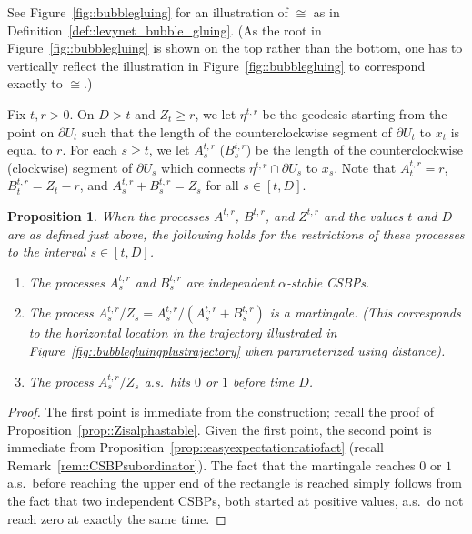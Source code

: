\documentclass[JEP,XML,SOM,Unicode]{cedram}
\theoremstyle{plain}
\numberwithin{theorem}{section}
\newtheorem{proposition}[theorem]{Proposition}
\theoremstyle{definition}
\begin{document}
See Figure~\ref{fig::bubblegluing} for an illustration of $\cong$ as in Definition~\ref{def::levynet_bubble_gluing}. (As the root in Figure~\ref{fig::bubblegluing} is shown on the top rather than the bottom, one has to vertically reflect the illustration in Figure~\ref{fig::bubblegluing} to correspond exactly to $\cong$.)

Fix $t, r > 0$. On $D > t$ and $Z_t \geq r$, we let $\eta^{t,r}$ be the geodesic starting from the point on $\partial U_t$ such that the length of the counterclockwise segment of $\partial U_t$ to $x_t$ is equal to $r$. For each $s \geq t$, we let $A_s^{t,r}$ (\resp $B_s^{t,r}$) be the length of the counterclockwise (\resp clockwise) segment of $\partial U_s$ which connects $\eta^{t,r} \cap \partial U_s$ to $x_s$. Note that $A_t^{t,r} = r$, $B_t^{t,r} = Z_t - r$, and $A_s^{t,r} + B_s^{t,r} = Z_s$ for all $s \in [t,D]$.

\begin{proposition}
\label{prop::levynetgeodesictrajectoriesdetermined}
When the processes $A^{t,r}$, $B^{t,r}$, and $Z^{t,r}$ and the values $t$ and $D$ are as defined just above, the following holds for the restrictions of these processes to the interval $s \in [t, D]$.
\begin{enumerate}
\item The processes $A_s^{t,r}$ and $B_s^{t,r}$ are independent $\alpha$-stable CSBPs.
\item The process $A_s^{t,r} / Z_s = A_s^{t,r} / (A_s^{t,r} + B_s^{t,r})$ is a martingale. (This corresponds to the horizontal location in the trajectory illustrated in Figure~\ref{fig::bubblegluingplustrajectory} when parameterized using distance).
\item The process $A_s^{t,r} / Z_s$ a.s.\ hits $0$ or $1$ before time $D$.
\end{enumerate}
\end{proposition}
\begin{proof}
The first point is immediate from the construction; recall the proof of Proposition~\ref{prop::Zisalphastable}. Given the first point, the second point is immediate from Proposition~\ref{prop::easyexpectationratiofact} (recall Remark~\ref{rem::CSBPsubordinator}). The fact that the martingale reaches $0$ or $1$ a.s.\ before reaching the upper end of the rectangle is reached simply follows from the fact that two independent CSBPs, both started at positive values, a.s.\ do not reach zero at exactly the same time.
\end{proof}
\end{document}
